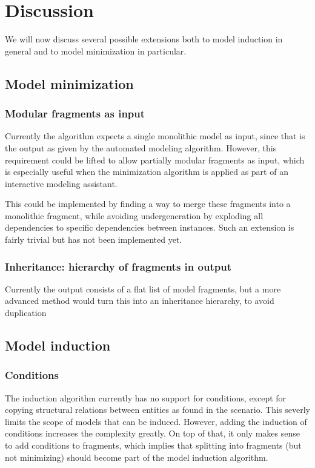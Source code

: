 \documentclass{article} %
\begin{document}
\section{Discussion}
We will now discuss several possible extensions both to model induction in
general and to model minimization in particular.

\subsection{Model minimization}
\subsubsection{Modular fragments as input}

Currently the algorithm expects a single monolithic model as input, since that
is the output as given by the automated modeling algorithm. However, this
requirement could be lifted to allow partially modular fragments as input,
which is especially useful when the minimization algorithm is applied as part
of an interactive modeling assistant.

This could be implemented by finding a way to merge these fragments into a
monolithic fragment, while avoiding undergeneration by exploding all
dependencies to specific dependencies between instances. Such an extension is
fairly trivial but has not been implemented yet.

\subsubsection{Inheritance: hierarchy of fragments in output}

Currently the output consists of a flat list of model fragments, but a more
advanced method would turn this into an inheritance hierarchy, to avoid
duplication

\subsection{Model induction}

\subsubsection{Conditions}

The induction algorithm currently has no support for conditions, except for
copying structural relations between entities as found in the scenario. This
severly limits the scope of models that can be induced. However, adding the
induction of conditions increases the complexity greatly. On top of that, it
only makes sense to add conditions to fragments, which implies that splitting
into fragments (but not minimizing) should become part of the model induction
algorithm.
\end{document}
